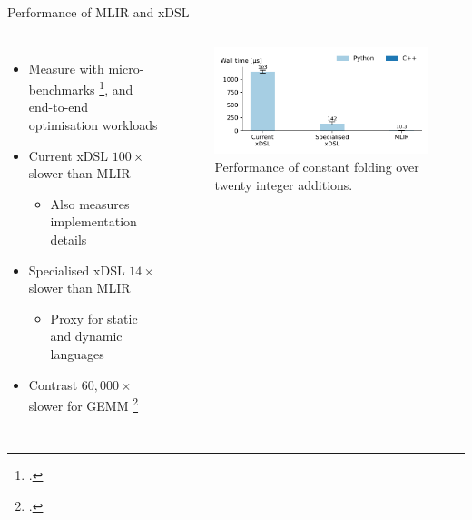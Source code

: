 \documentclass[10pt,aspectratio=169]{beamer}
\renewcommand{\cite}{\footcite}
\begin{document}
\begin{frame}{Performance of MLIR and xDSL}
    \begin{columns}[T,onlytextwidth]
            \begin{itemize}
                \vspace{2em}
                \itemindent=-13pt
                \item Measure with micro-benchmarks \cite{aminiHowSlowMLIR2024}, and end-to-end optimisation workloads
                \vspace{1.5em}
                \item Current xDSL $100\times$ slower than MLIR
                \begin{itemize}
                    \itemindent=-13pt
                    \item Also measures implementation details
                \end{itemize}
                \item Specialised xDSL $14\times$ slower than MLIR
                \begin{itemize}
                    \itemindent=-13pt
                    \item Proxy for static and dynamic languages
                \end{itemize}
                \item Contrast $60,000\times$ slower for GEMM \cite{emerybergerPythonPerformanceMatters2022}
            \end{itemize}
            \vspace{1em}
            \vspace{1em}
            \begin{figure}[H]
                \includegraphics[width=\textwidth]{images/constant_performance.pdf}
                \caption{Performance of constant folding over twenty integer additions.}
                \label{fig:constant_performance}
            \end{figure}
    \end{columns}
\end{frame}
\end{document}
